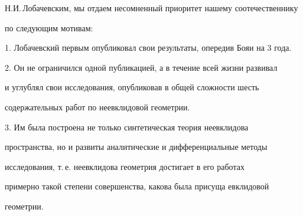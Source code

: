 Н.И.\,Лобачевским, мы отдаем несомненный приоритет нашему соотечественнику 


по следующим мотивам:





1. Лобачевский первым опубликовал свои результаты, опередив Бояи на 3 года.





2. Он не ограничился одной публикацией, а в течение всей жизни развивал 


и углублял свои исследования, опубликовав в общей сложности шесть 


содержательных работ по неевклидовой геометрии.





3. Им была построена не только синтетическая теория неевклидова 


пространства, но и развиты аналитические и дифференциальные методы 


исследования, т.\,е. неевклидова геометрия достигает в его работах 


примерно такой степени совершенства, какова была присуща евклидовой


геометрии.





